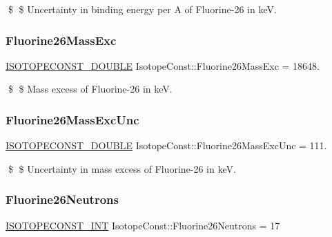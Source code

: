 \$ \$ Uncertainty in binding energy per A of Fluorine-\/26 in keV. \mbox{\label{group___isotope_const-_fluorine-_f26_ga768dfba9c7d2e3daa8d1029837392cff}} 
\subsubsection{\texorpdfstring{Fluorine26\+Mass\+Exc}{Fluorine26MassExc}}
{\footnotesize\ttfamily \mbox{\hyperlink{group___isotope_const-_macros_ga8f45a7272ce02c0b4c65c44636ed719a}{I\+S\+O\+T\+O\+P\+E\+C\+O\+N\+S\+T\+\_\+\+D\+O\+U\+B\+LE}} Isotope\+Const\+::\+Fluorine26\+Mass\+Exc = 18648.}

\$ \$ Mass excess of Fluorine-\/26 in keV. \mbox{\label{group___isotope_const-_fluorine-_f26_ga0ce90e1a718d0aeea27b7c996095fc82}} 
\subsubsection{\texorpdfstring{Fluorine26\+Mass\+Exc\+Unc}{Fluorine26MassExcUnc}}
{\footnotesize\ttfamily \mbox{\hyperlink{group___isotope_const-_macros_ga8f45a7272ce02c0b4c65c44636ed719a}{I\+S\+O\+T\+O\+P\+E\+C\+O\+N\+S\+T\+\_\+\+D\+O\+U\+B\+LE}} Isotope\+Const\+::\+Fluorine26\+Mass\+Exc\+Unc = 111.}

\$ \$ Uncertainty in mass excess of Fluorine-\/26 in keV. \mbox{\label{group___isotope_const-_fluorine-_f26_gad5ed672e82bd4792a63c3fb1540c7d5b}} 
\subsubsection{\texorpdfstring{Fluorine26\+Neutrons}{Fluorine26Neutrons}}
{\footnotesize\ttfamily \mbox{\hyperlink{group___isotope_const-_macros_ga5f18360b3e99483a35c32d789e62621c}{I\+S\+O\+T\+O\+P\+E\+C\+O\+N\+S\+T\+\_\+\+I\+NT}} Isotope\+Const\+::\+Fluorine26\+Neutrons = 17}


